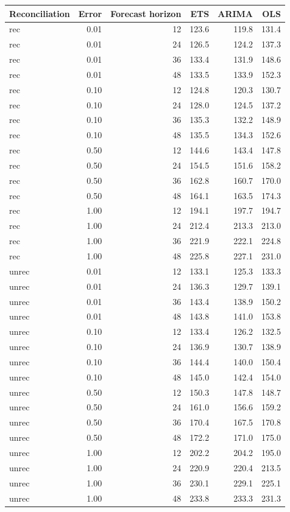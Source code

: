 \documentclass[11pt,a4paper,]{article}
\let\origtable\table
\let\endorigtable\endtable
\renewenvironment{table}[1][2] {
    \expandafter\origtable\expandafter[!htbp]
} {
    \endorigtable
}
\begin{document}
\begin{table}[!h]

\caption{\label{tab:TourismdatasimfixnoiseFH}Mean(RMSE) on one to four year test set with different error levels for ETS, ARIMA and OLS with and without reconciliation - Fixed origin - 304 bottom level series and 8 levels of hierarchy - Simulated tourism dataset}
\centering
\begin{tabular}[t]{lrrrrr}
\toprule
Reconciliation & Error & Forecast horizon & ETS & ARIMA & OLS\\
\midrule
rec & 0.01 & 12 & 123.6 & 119.8 & 131.4\\
rec & 0.01 & 24 & 126.5 & 124.2 & 137.3\\
rec & 0.01 & 36 & 133.4 & 131.9 & 148.6\\
rec & 0.01 & 48 & 133.5 & 133.9 & 152.3\\
rec & 0.10 & 12 & 124.8 & 120.3 & 130.7\\
rec & 0.10 & 24 & 128.0 & 124.5 & 137.2\\
rec & 0.10 & 36 & 135.3 & 132.2 & 148.9\\
rec & 0.10 & 48 & 135.5 & 134.3 & 152.6\\
rec & 0.50 & 12 & 144.6 & 143.4 & 147.8\\
rec & 0.50 & 24 & 154.5 & 151.6 & 158.2\\
rec & 0.50 & 36 & 162.8 & 160.7 & 170.0\\
rec & 0.50 & 48 & 164.1 & 163.5 & 174.3\\
rec & 1.00 & 12 & 194.1 & 197.7 & 194.7\\
rec & 1.00 & 24 & 212.4 & 213.3 & 213.0\\
rec & 1.00 & 36 & 221.9 & 222.1 & 224.8\\
rec & 1.00 & 48 & 225.8 & 227.1 & 231.0\\
unrec & 0.01 & 12 & 133.1 & 125.3 & 133.3\\
unrec & 0.01 & 24 & 136.3 & 129.7 & 139.1\\
unrec & 0.01 & 36 & 143.4 & 138.9 & 150.2\\
unrec & 0.01 & 48 & 143.8 & 141.0 & 153.8\\
unrec & 0.10 & 12 & 133.4 & 126.2 & 132.5\\
unrec & 0.10 & 24 & 136.9 & 130.7 & 138.9\\
unrec & 0.10 & 36 & 144.4 & 140.0 & 150.4\\
unrec & 0.10 & 48 & 145.0 & 142.4 & 154.0\\
unrec & 0.50 & 12 & 150.3 & 147.8 & 148.7\\
unrec & 0.50 & 24 & 161.0 & 156.6 & 159.2\\
unrec & 0.50 & 36 & 170.4 & 167.5 & 170.8\\
unrec & 0.50 & 48 & 172.2 & 171.0 & 175.0\\
unrec & 1.00 & 12 & 202.2 & 204.2 & 195.0\\
unrec & 1.00 & 24 & 220.9 & 220.4 & 213.5\\
unrec & 1.00 & 36 & 230.1 & 229.1 & 225.1\\
unrec & 1.00 & 48 & 233.8 & 233.3 & 231.3\\
\bottomrule
\end{tabular}
\end{table}
\end{document}
